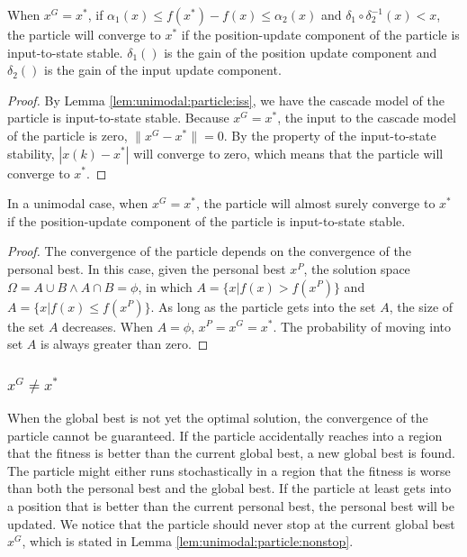 \begin{mythm}
\label{thm:unimodal:particle:garuantee_converge}
When $ x^{G} = x^{*} $,  if $ \alpha_{1} (x) \leq f(x^{*}) - f(x) \leq \alpha_{2} (x) $ and $ \delta_{1} \circ \delta_{2}^{-1} (x)  < x $, the particle will converge to $ x^{*} $ if the position-update component of the particle is input-to-state stable.
$ \delta_{1} () $ is the gain of the position update component and $ \delta_{2} () $ is the gain of the input update component.
\begin{proof}
By Lemma \ref{lem:unimodal:particle:iss}, we have the cascade model of the particle is input-to-state stable.
Because $ x^{G} = x^{*} $, the input to the cascade model of the particle is zero, $ \lVert x^{G} - x^{*} \rVert = 0 $.
By the property of the input-to-state stability, $ | x(k) - x^{*} | $ will converge to zero, which means that the particle will converge to $ x^{*} $.
\end{proof}
\end{mythm}



\begin{mythm}
\label{thm:unimodal:particle:converge}
In a unimodal case, when $ x^{G} = x^{*} $, the particle will almost surely converge to $ x^{*} $ if the position-update component of the particle is input-to-state stable.
\begin{proof}
The convergence of the particle depends on the convergence of the personal best.
In this case, given the personal best $ x^{P} $, the solution space $ \Omega = A \cup B \land A \cap B = \phi $, in which 
$ A = \{ x | f(x) > f(x^{P}) \} $ and $ A = \{ x | f(x) \leq f(x^{P}) \} $.
As long as the particle gets into the set $ A $, the size of the set $ A $ decreases.
When $ A = \phi $, $ x^{P} = x^{G} = x^{*} $.
The probability of moving into set $ A $ is always greater than zero.
\end{proof}
\end{mythm}

\subsubsection{ $ x^{G} \not = x^{*}  $ }

When the global best is not yet the optimal solution, the convergence of the particle cannot be guaranteed.
If the particle accidentally reaches into a region that the fitness is better than the current global best, a new global best is found.
The particle might either runs stochastically in a region that the fitness is worse than both the personal best and the global best.
If the particle at least gets into a position that is better than the current personal best, the personal best will be updated. 
We notice that the particle should never stop at the current global best $ x^{G} $, which is stated in Lemma \ref{lem:unimodal:particle:nonstop}.

